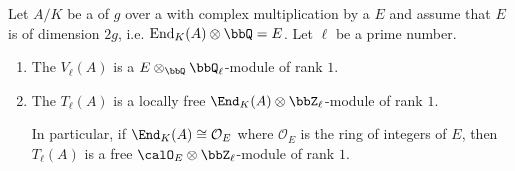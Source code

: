 \begin{proposition} \label{proposition:ell_adic_tate_module_for_a_cm_abelian_variety_whose_cm_field_is_maximal_degree_is_locally_free_rank_1_module_over_rational_endomorphism_algebra}
    Let $A/K$ be a  of  $g$ over a  with complex multiplication by a  $E$ and assume that $E$ is of dimension $2g$, i.e. $\operatorname{End}_K(A) \otimes \bbQ = E$. Let $\ell$ be a prime number. 
    \begin{enumerate}
        \item The  $V_\ell(A)$ is a  $E \otimes_\bbQ \bbQ_\ell$-module of rank $1$. 

        \item The  $T_\ell(A)$ is a locally free $\End_K(A) \otimes \bbZ_\ell$-module of rank $1$.

        In particular, if $\End_K(A) \cong \mathcal{O}_E$ where $\mathcal{O}_E$ is the ring of integers of $E$, then $T_\ell(A)$ is a free $\calO_E \otimes \bbZ_\ell$-module of rank $1$.

    \end{enumerate}
\end{proposition}